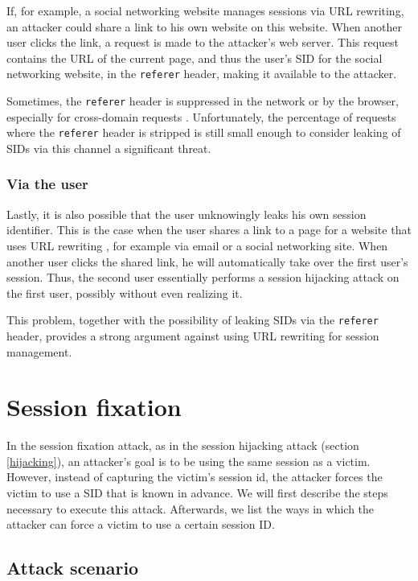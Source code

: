 If, for example, a social networking website manages sessions via URL rewriting, an attacker could share a link to his own website on this website. When another user clicks the link, a request is made to the attacker's web server. This request contains the URL of the current page, and thus the user's SID for the social networking website, in the \texttt{referer} header, making it available to the attacker.

Sometimes, the \texttt{referer} header is suppressed in the network or by the browser, especially for cross-domain requests \cite{Barth2008}. Unfortunately, the percentage of requests where the \texttt{referer} header is stripped is still small enough to consider leaking of SIDs via this channel a significant threat.

\subsubsection{Via the user}

Lastly, it is also possible that the user unknowingly leaks his own session identifier. This is the case when the user shares a link to a page for a website that uses URL rewriting \cite{Johnston2004}, for example via email or a social networking site. When another user clicks the shared link, he will automatically take over the first user's session. Thus, the second user essentially performs a session hijacking attack on the first user, possibly without even realizing it.

This problem, together with the possibility of leaking SIDs via the \texttt{referer} header, provides a strong argument against using URL rewriting for session management.

\section{Session fixation}\label{fixation}

In the session fixation attack, as in the \gls{session hijacking} attack (section \ref{hijacking}), an attacker's goal is to be using the same session as a victim. However, instead of capturing the victim's \gls{session id}, the attacker forces the victim to use a SID that is known in advance. We will first describe the steps necessary to execute this attack. Afterwards, we list the ways in which the attacker can force a victim to use a certain session ID.

\subsection{Attack scenario}

